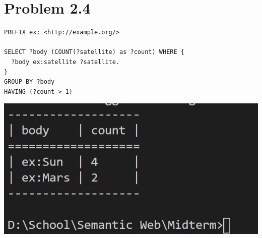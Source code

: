 \documentclass{article}
\newenvironment{problem}[1]{
  \nobreak\section*{Problem #1}
}{}
\begin{document}
  \begin{problem}{2.4}
    \begin{verbatim}
PREFIX ex: <http://example.org/>

SELECT ?body (COUNT(?satellite) as ?count) WHERE {
  ?body ex:satellite ?satellite.
}
GROUP BY ?body
HAVING (?count > 1)
    \end{verbatim}

    \includegraphics{images/3.jpg}
  \end{problem}
\end{document}
